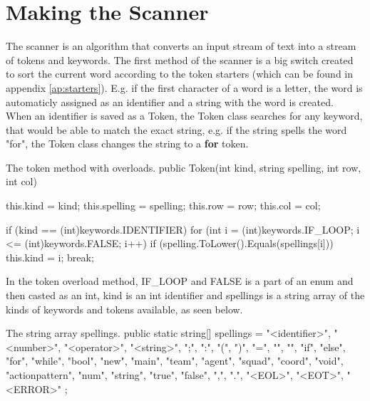 \section{Making the Scanner}
The scanner is an algorithm that converts an input stream of text into a stream of tokens and keywords. The first method of the scanner is a big switch created to sort the current word according to the token starters (which can be found in appendix \ref{ap:starters}). E.g. if the first character of a word is a letter, the word is automaticly assigned as an identifier and a string with the word is created.\\
When an identifier is saved as a Token, the Token class searches for any keyword, that would be able to match the exact string, e.g. if the string spells the word "for", the Token class changes the string to a \textbf{for} token.\\

\begin{source}{The token method with overloads.}{}
public Token(int kind, string spelling, int row, int col)
        {
            this.kind = kind;
            this.spelling = spelling;
            this.row = row;
            this.col = col;

            if (kind == (int)keywords.IDENTIFIER)
            {
                for (int i = (int)keywords.IF_LOOP; i <= (int)keywords.FALSE; i++)
                {
                    if (spelling.ToLower().Equals(spellings[i]))
                    {
                        this.kind = i;
                        break;
                    }
                }
            }
        }
\end{source}
In the token overload method, IF\_LOOP and FALSE is a part of an enum and then casted as an int, kind is an int identifier and spellings is a string array of the kinds of keywords and tokens available, as seen below.

\begin{source}{The string array spellings.}{}
public static string[] spellings = 
        {
            "<identifier>", "<number>", "<operator>", "<string>", ";", ":", "(", ")", "=", "{", "}", 
            "if", "else", "for", "while", "bool", "new", "main", "team", "agent", "squad", "coord", "void", 
            "actionpattern", "num", "string", "true", "false", ",", ".", "<EOL>", "<EOT>", "<ERROR>"                         
        };
\end{source}

